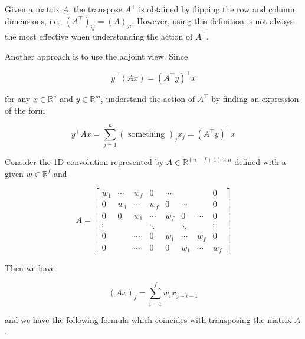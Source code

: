 \documentclass{report}
\begin{document}
Given a matrix $A$, the transpose $A^{\top}$ is obtained by flipping the row and column dimensions, i.e., $\left(A^{\top}\right)_{i j}=(A)_{j i}$.
However, using this definition is not always the most effective when understanding the action of $A^{\top}$.

Another approach is to use the adjoint view. Since

$$
y^{\top}(A x)=\left(A^{\top} y\right)^{\top} x
$$

for any $x \in \mathbb{R}^{n}$ and $y \in \mathbb{R}^{m}$, understand the action of $A^{\top}$ by finding an expression of the form

$$
y^{\top} A x=\sum_{j=1}^{n}(\text { something })_{j} x_{j}=\left(A^{\top} y\right)^{\top} x
$$

\begin{example}
    Consider the 1D convolution represented by $A \in \mathbb{R}^{(n-f+1) \times n}$ defined with a given $w \in \mathbb{R}^{f}$ and

    $$
    A=\left[\begin{array}{cccccccc}
    w_{1} & \cdots & w_{f} & 0 & \cdots & & & 0 \\
    0 & w_{1} & \cdots & w_{f} & 0 & \cdots & & 0 \\
    0 & 0 & w_{1} & \cdots & w_{f} & 0 & \cdots & 0 \\
    \vdots & & & \ddots & & \ddots & & \vdots \\
    0 & & \cdots & 0 & w_{1} & \cdots & w_{f} & 0 \\
    0 & & \cdots & 0 & 0 & w_{1} & \cdots & w_{f}
    \end{array}\right]
    $$

    Then we have

    $$
    (A x)_{j}=\sum_{i=1}^{f} w_{i} x_{j+i-1}
    $$

    \par\noindent\textcolor{gray}{\hdashrule{\textwidth}{0.4pt}{1pt 2pt}}

    and we have the following formula which coincides with transposing the matrix $A$.


\end{example}
\end{document}
